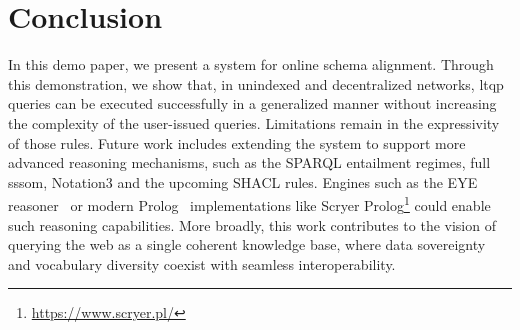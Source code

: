 \section{Conclusion}\label{sec:conclusion}
In this demo paper, we present a system for online schema alignment.
Through this demonstration, we show that, in unindexed and decentralized networks, \gls{ltqp} queries can be executed successfully in a generalized manner without increasing the complexity of the user-issued queries.
Limitations remain in the expressivity of those rules.
Future work includes extending the system to support more advanced reasoning mechanisms, such as the SPARQL entailment regimes, full \gls{sssom}, Notation3 and the upcoming SHACL rules.
Engines such as the EYE reasoner~\cite{n3Verborgh} or modern Prolog~\cite{Colmerauer1996} implementations like Scryer Prolog\footnote{\url{https://www.scryer.pl/}} could enable such reasoning capabilities.
More broadly, this work contributes to the vision of querying the web as a single coherent knowledge base, where data sovereignty and vocabulary diversity coexist with seamless interoperability.
